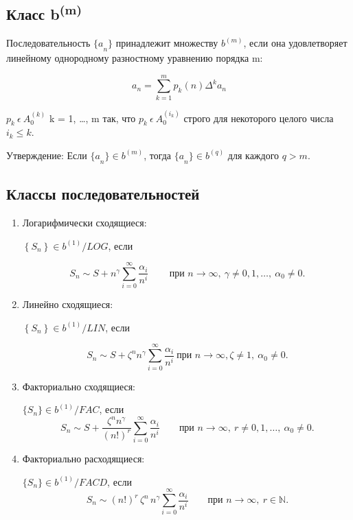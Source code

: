 \documentclass[14pt, a4paper]{extarticle}
\theoremstyle{definition}
\theoremstyle{remark}
\begin{document}
\subsection*{Класс b\textsuperscript{(m)}}
Последовательность \({\{ a}_{n}\}\) принадлежит множеству \(b^{(m)}\),
если она удовлетворяет линейному однородному разностному уравнению
порядка m:

\[a_{n} = \sum_{k = 1}^{m}{p_{k}(n)\Delta^{k}a_{n}}\]

\(p_{k}\ \epsilon{\ A}_{0}^{(k)}\) k = 1, \ldots, m так, что
\(p_{k}\ \epsilon\ A_{0}^{(i_{k})}\) строго для некоторого целого числа
\(i_{k} \leq k\).

Утверждение: Если \({\{ a}_{n}\} \in b^{(m)}\), тогда \({\{ a}_{n}\} \in b^{(q)}\) для каждого \(q > m\).

\subsection*{Классы последовательностей}

\begin{enumerate}
\item
  Логарифмически сходящиеся:

\(\left\{ S_{n} \right\} \in b^{(1)}/LOG\), если

\[
S_{n} \sim S 
+ n^{\gamma} \sum_{i = 0}^{\infty} \frac{\alpha_{i}}{n^{i}} \, 
\qquad \text{при } n \to \infty,\ \gamma \neq 0,1,\ldots,\ \alpha_{0} \neq 0.
\]

\item
  Линейно сходящиеся:

\(\left\{ S_{n} \right\} \in b^{(1)}/LIN\), если

\[S_{n}\sim S + \zeta^{n}n^{\gamma}\sum_{i = 0}^{\infty}\frac{\alpha_{i}}{n^{i}}\ \text{при } n \rightarrow \infty,\zeta \neq 1,\ \alpha_{0} \neq 0.\]

\item
  Факториально сходящиеся:

\(\{ S_{n} \} \in b^{(1)}/FAC\), если
\[
S_{n} \sim 
S + \frac{\zeta^{n} n^{\gamma}}{(n!)^{r}}
\sum_{i = 0}^{\infty} \frac{\alpha_{i}}{n^{i}}
\qquad \text{при } n \to \infty,\ r \neq 0,1,\ldots,\ \alpha_{0} \neq 0.
\]

\item
  Факториально расходящиеся:

\(\{ S_{n} \} \in b^{(1)}/FACD\), если
\[
S_{n} \sim 
(n!)^{r} \, \zeta^{n} \, n^{\gamma}
\sum_{i = 0}^{\infty} \frac{\alpha_{i}}{n^{i}}
\qquad \text{при } n \to \infty,\ r \in \mathbb{N}.
\]
\end{enumerate}
\end{document}
